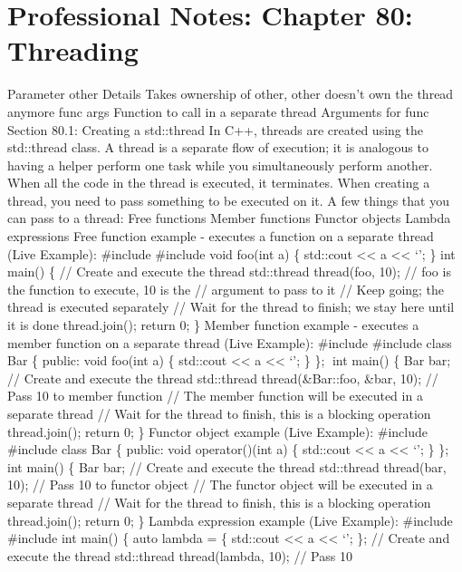 \hypertarget{professional-notes-chapter-80-threading-1}{%
\chapter{Professional Notes: Chapter 80:
Threading}\label{professional-notes-chapter-80-threading-1}}

Parameter other Details Takes ownership of other, other doesn't own the
thread anymore func args Function to call in a separate thread Arguments
for func Section 80.1: Creating a std::thread In C++, threads are
created using the std::thread class. A thread is a separate ﬂow of
execution; it is analogous to having a helper perform one task while you
simultaneously perform another. When all the code in the thread is
executed, it terminates. When creating a thread, you need to pass
something to be executed on it. A few things that you can pass to a
thread: Free functions Member functions Functor objects Lambda
expressions Free function example - executes a function on a separate
thread (Live Example): \#include \#include void foo(int a) \{ std::cout
\textless\textless{} a \textless\textless{} `\n'; \} int main() \{ //
Create and execute the thread std::thread thread(foo, 10); // foo is the
function to execute, 10 is the // argument to pass to it // Keep going;
the thread is executed separately // Wait for the thread to finish; we
stay here until it is done thread.join(); return 0; \} Member function
example - executes a member function on a separate thread (Live
Example): \#include \#include class Bar \{ public: void foo(int a) \{
std::cout \textless\textless{} a \textless\textless{} `\n'; \} \}; int
main() \{ Bar bar; // Create and execute the thread std::thread
thread(\&Bar::foo, \&bar, 10); // Pass 10 to member function // The
member function will be executed in a separate thread // Wait for the
thread to finish, this is a blocking operation thread.join(); return 0;
\} Functor object example (Live Example): \#include \#include class Bar
\{ public: void operator()(int a) \{ std::cout \textless\textless{} a
\textless\textless{} `\n'; \} \}; int main() \{ Bar bar; // Create and
execute the thread std::thread thread(bar, 10); // Pass 10 to functor
object // The functor object will be executed in a separate thread //
Wait for the thread to finish, this is a blocking operation
thread.join(); return 0; \} Lambda expression example (Live Example):
\#include \#include int main() \{ auto lambda = \href{int\%20a}{} \{
std::cout \textless\textless{} a \textless\textless{} `\n'; \}; //
Create and execute the thread std::thread thread(lambda, 10); // Pass 10
